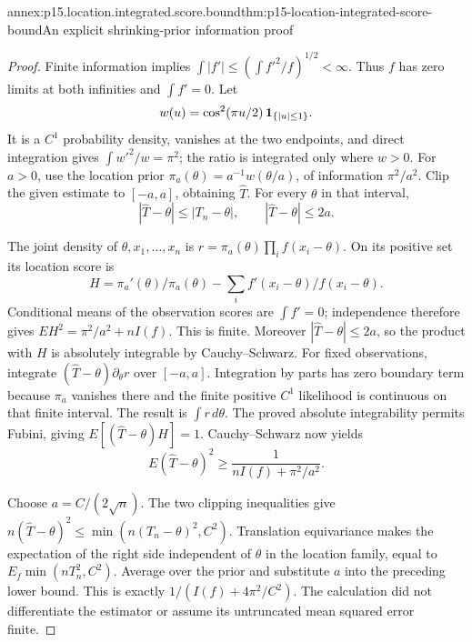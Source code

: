 \begin{annexitem}{annex:p15.location.integrated.score.bound}{thm:p15-location-integrated-score-bound}{An explicit shrinking-prior information proof}
\begin{proof}
Finite information implies
\(\int|f'|\leq(\int f'^2/f)^{1/2}<\infty\).
Thus \(f\) has zero limits at both infinities and \(\int f'=0\).
Let
\[
 w(u)=\cos^2(\pi u/2)\,{\bf1}_{\{|u|\leq1\}}.
\]
It is a \(C^1\) probability density, vanishes at the two endpoints,
and direct integration gives
\(\int w'^2/w=\pi^2\); the ratio is integrated only where \(w>0\).
For \(a>0\), use the location prior
\(\pi_a(\theta)=a^{-1}w(\theta/a)\), of information \(\pi^2/a^2\).
Clip the given estimate to \([-a,a]\), obtaining \(\widehat T\).
For every \(\theta\) in that interval,
\[
 |\widehat T-\theta|\leq|T_n-\theta|,\qquad
 |\widehat T-\theta|\leq2a .
\]

The joint density of \(\theta,x_1,\ldots,x_n\) is
\(r=\pi_a(\theta)\prod_i f(x_i-\theta)\).
On its positive set its location score is
\[
 H=\pi_a'(\theta)/\pi_a(\theta)
                -\sum_i f'(x_i-\theta)/f(x_i-\theta).
\]
Conditional means of the observation scores are \(\int f'=0\);
independence therefore gives
\(EH^2=\pi^2/a^2+nI(f)\).
This is finite. Moreover \(|\widehat T-\theta|\leq2a\), so
the product with \(H\) is absolutely integrable by Cauchy--Schwarz.
For fixed observations, integrate
\((\widehat T-\theta)\partial_\theta r\) over \([-a,a]\).
Integration by parts has zero boundary term because \(\pi_a\)
vanishes there and the finite positive \(C^1\) likelihood is
continuous on that finite interval. The result is \(\int r\,d\theta\).
The proved absolute integrability permits Fubini, giving
\(E[(\widehat T-\theta)H]=1\).
Cauchy--Schwarz now yields
\[
 E(\widehat T-\theta)^2\geq
                  \frac1{nI(f)+\pi^2/a^2}.
\]

Choose \(a=C/(2\sqrt n)\).
The two clipping inequalities give
\(n(\widehat T-\theta)^2\leq\min(n(T_n-\theta)^2,C^2)\).
Translation equivariance makes the expectation of the right side
independent of \(\theta\) in the location family, equal to
\(E_f\min(nT_n^2,C^2)\).
Average over the prior and substitute \(a\) into the preceding
lower bound. This is exactly
\(1/(I(f)+4\pi^2/C^2)\).
The calculation did not differentiate the estimator or assume its
untruncated mean squared error finite.
\end{proof}
\end{annexitem}

